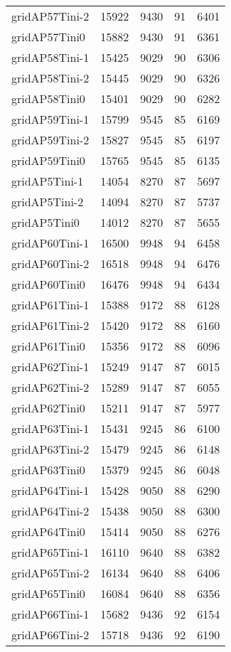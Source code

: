 \begin{longtable}{lrrrr}
gridAP57Tini-2 & 15922 & 9430 & 91 & 6401 \\
gridAP57Tini0 & 15882 & 9430 & 91 & 6361 \\
gridAP58Tini-1 & 15425 & 9029 & 90 & 6306 \\
gridAP58Tini-2 & 15445 & 9029 & 90 & 6326 \\
gridAP58Tini0 & 15401 & 9029 & 90 & 6282 \\
gridAP59Tini-1 & 15799 & 9545 & 85 & 6169 \\
gridAP59Tini-2 & 15827 & 9545 & 85 & 6197 \\
gridAP59Tini0 & 15765 & 9545 & 85 & 6135 \\
gridAP5Tini-1 & 14054 & 8270 & 87 & 5697 \\
gridAP5Tini-2 & 14094 & 8270 & 87 & 5737 \\
gridAP5Tini0 & 14012 & 8270 & 87 & 5655 \\
gridAP60Tini-1 & 16500 & 9948 & 94 & 6458 \\
gridAP60Tini-2 & 16518 & 9948 & 94 & 6476 \\
gridAP60Tini0 & 16476 & 9948 & 94 & 6434 \\
gridAP61Tini-1 & 15388 & 9172 & 88 & 6128 \\
gridAP61Tini-2 & 15420 & 9172 & 88 & 6160 \\
gridAP61Tini0 & 15356 & 9172 & 88 & 6096 \\
gridAP62Tini-1 & 15249 & 9147 & 87 & 6015 \\
gridAP62Tini-2 & 15289 & 9147 & 87 & 6055 \\
gridAP62Tini0 & 15211 & 9147 & 87 & 5977 \\
gridAP63Tini-1 & 15431 & 9245 & 86 & 6100 \\
gridAP63Tini-2 & 15479 & 9245 & 86 & 6148 \\
gridAP63Tini0 & 15379 & 9245 & 86 & 6048 \\
gridAP64Tini-1 & 15428 & 9050 & 88 & 6290 \\
gridAP64Tini-2 & 15438 & 9050 & 88 & 6300 \\
gridAP64Tini0 & 15414 & 9050 & 88 & 6276 \\
gridAP65Tini-1 & 16110 & 9640 & 88 & 6382 \\
gridAP65Tini-2 & 16134 & 9640 & 88 & 6406 \\
gridAP65Tini0 & 16084 & 9640 & 88 & 6356 \\
gridAP66Tini-1 & 15682 & 9436 & 92 & 6154 \\
gridAP66Tini-2 & 15718 & 9436 & 92 & 6190 \\

\end{longtable}
